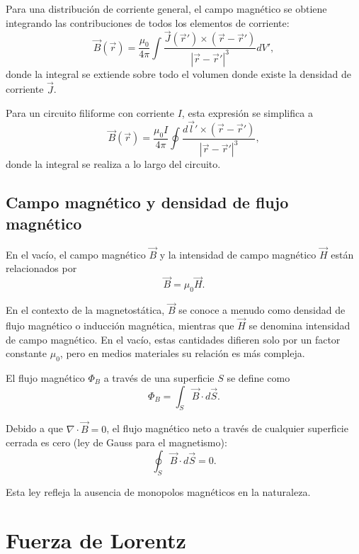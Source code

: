 \documentclass[12pt,a4paper]{book}
\begin{document}
Para una distribución de corriente general, el campo magnético se obtiene integrando las contribuciones de todos los elementos de corriente:
\begin{equation}
\vec{B}(\vec{r}) = \frac{\mu_0}{4\pi} \int \frac{\vec{J}(\vec{r}') \times (\vec{r} - \vec{r}')}{|\vec{r} - \vec{r}'|^3} dV',
\end{equation}
donde la integral se extiende sobre todo el volumen donde existe la densidad de corriente $\vec{J}$.

Para un circuito filiforme con corriente $I$, esta expresión se simplifica a
\begin{equation}
\vec{B}(\vec{r}) = \frac{\mu_0 I}{4\pi} \oint \frac{d\vec{l}' \times (\vec{r} - \vec{r}')}{|\vec{r} - \vec{r}'|^3},
\end{equation}
donde la integral se realiza a lo largo del circuito.

\subsection{Campo magnético y densidad de flujo magnético}

En el vacío, el campo magnético $\vec{B}$ y la intensidad de campo magnético $\vec{H}$ están relacionados por
\begin{equation}
\vec{B} = \mu_0 \vec{H}.
\end{equation}

En el contexto de la magnetostática, $\vec{B}$ se conoce a menudo como densidad de flujo magnético o inducción magnética, mientras que $\vec{H}$ se denomina intensidad de campo magnético. En el vacío, estas cantidades difieren solo por un factor constante $\mu_0$, pero en medios materiales su relación es más compleja.

El flujo magnético $\Phi_B$ a través de una superficie $S$ se define como
\begin{equation}
\Phi_B = \int_S \vec{B} \cdot d\vec{S}.
\end{equation}

Debido a que $\nabla \cdot \vec{B} = 0$, el flujo magnético neto a través de cualquier superficie cerrada es cero (ley de Gauss para el magnetismo):
\begin{equation}
\oint_S \vec{B} \cdot d\vec{S} = 0.
\end{equation}

Esta ley refleja la ausencia de monopolos magnéticos en la naturaleza.

\section{Fuerza de Lorentz}
\end{document}
